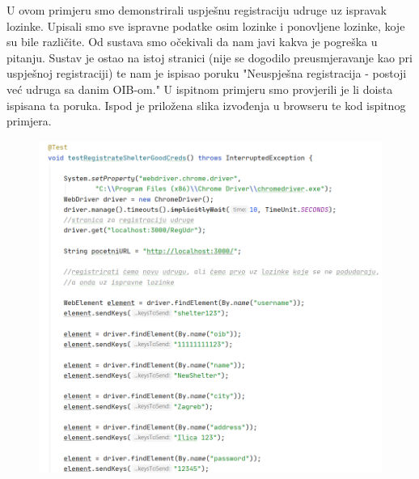 		 U ovom primjeru smo demonstrirali uspješnu registraciju udruge uz ispravak lozinke. Upisali smo sve ispravne podatke osim lozinke i ponovljene lozinke, koje su bile različite. Od sustava smo očekivali da nam javi kakva je pogreška u pitanju. Sustav je ostao na istoj stranici (nije se dogodilo preusmjeravanje kao pri uspješnoj registraciji) te nam je ispisao poruku "Neuspješna registracija - postoji već udruga sa danim OIB-om." U ispitnom primjeru smo provjerili je li doista ispisana ta poruka. Ispod je priložena slika izvođenja u browseru te kod ispitnog primjera. 
			 
			 \begin{figure}[H]
			 	\includegraphics[scale=0.75]{slike/Selenium3.1.PNG}
			 	\centering
			 \end{figure}
